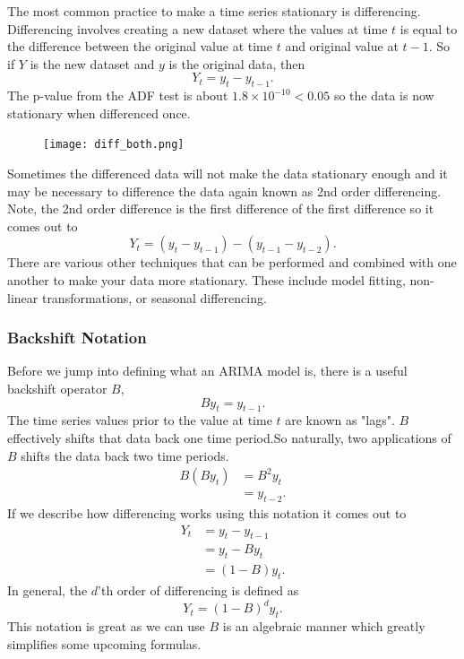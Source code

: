 \documentclass{article}
\begin{document}
    The most common practice to make a time series stationary is differencing. Differencing involves creating a new dataset where the values at time $t$ is equal to the difference between the original value at time $t$ and original value at $t-1$. So if $Y$ is the new dataset and $y$ is the original data, then
    \begin{equation*}
      Y_t = y_t - y_{t-1}.
    \end{equation*}
    The p-value from the ADF test is about $1.8 \times 10^{-10} < 0.05$ so the data is now stationary when differenced once.
    \begin{figure}[H]
      \centering
      \texttt{[image: diff\_both.png]}
    \end{figure}
    Sometimes the differenced data will not make the data stationary enough and it may be necessary to difference the data again known as 2nd order differencing. Note, the 2nd order difference is the first difference of the first difference so it comes out to
    \begin{equation*}
      Y_t = (y_t - y_{t-1}) - (y_{t-1} - y_{t-2}).
    \end{equation*}
    There are various other techniques that can be performed and combined with one another to make your data more stationary. These include model fitting, non-linear transformations, or seasonal differencing.

    \subsubsection{Backshift Notation}
    Before we jump into defining what an ARIMA model is, there is a useful backshift operator $B$,
    \begin{equation*}
      By_t = y_{t-1}.
    \end{equation*}
    The time series values prior to the value at time $t$ are known as "lags". $B$ effectively shifts that data back one time period.So naturally, two applications of $B$ shifts the data back two time periods. 
    \begin{align*}
      B(By_t) &= B^2y_t \\
      &= y_{t-2}.
    \end{align*}
    If we describe how differencing works using this notation it comes out to
    \begin{align*}
      Y_t &= y_t - y_{t-1} \\
      &= y_t - By_t \\
      &= (1 - B)y_t.
    \end{align*}
    In general, the $d$'th order of differencing is defined as 
    \begin{equation*}
      Y_t = (1 - B)^dy_t.
    \end{equation*}
    This notation is great as we can use $B$ is an algebraic manner which greatly simplifies some upcoming formulas.
\end{document}
